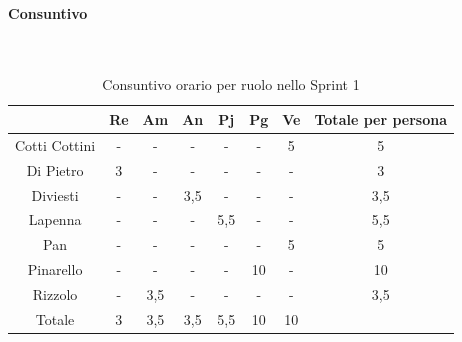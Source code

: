 \documentclass{article}
\begin{document}
                \paragraph{Consuntivo}\mbox{}\\
                \begin{table}[H]
                    \centering
                    \begin{tabular}{|c|c|c|c|c|c|c|c|}
                    \hline
                                    & Re  & Am  & An  & Pj  & Pg  & Ve  & Totale per persona \\ \hline
                    Cotti Cottini & -   & -   & -   & -   & -   & 5   & 5                  \\ \hline
                    Di Pietro     & 3   & -   & -   & -   & -   & -   & 3                  \\ \hline
                    Diviesti      & -   & -   & 3,5 & -   & -   & -   & 3,5                \\ \hline
                    Lapenna       & -   & -   & -   & 5,5 & -   & -   & 5,5                \\ \hline
                    Pan           & -   & -   & -   & -   & -   & 5   & 5                  \\ \hline
                    Pinarello     & -   & -   & -   & -   & 10  & -   & 10                 \\ \hline
                    Rizzolo       & -   & 3,5 & -   & -   & -   & -   & 3,5                \\ \hline
                    Totale        & 3   & 3,5 & 3,5 & 5,5 & 10  & 10  &                    \\ \hline
                    \end{tabular}
                    \caption{Consuntivo orario per ruolo nello Sprint 1}
                \end{table}

\end{document}
